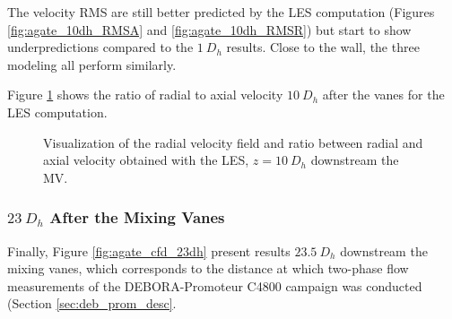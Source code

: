 \npar

The velocity RMS are still better predicted by the LES computation (Figures \ref{fig:agate_10dh_RMSA} and \ref{fig:agate_10dh_RMSR}) but start to show underpredictions compared to the $1\ D_{h}$ results. Close to the wall, the three modeling all perform similarly.


\npar

Figure \ref{fig:ur_s_ua_10dh} shows the ratio of radial to axial velocity $10~D_{h}$ after the vanes for the LES computation.

\begin{figure}
\caption{Visualization of the radial velocity field and ratio between radial and axial velocity obtained with the LES, $z=10~D_{h}$ downstream the MV.}
\label{fig:ur_s_ua_10dh}
\end{figure}



\npar


\subsubsection{$23\ D_{h}$ After the Mixing Vanes}

Finally, Figure \ref{fig:agate_cfd_23dh} present results $23.5\ D_{h}$ downstream the mixing vanes, which corresponds to the distance at which two-phase flow measurements of the DEBORA-Promoteur C4800 campaign was conducted (Section \ref{sec:deb_prom_desc}.


